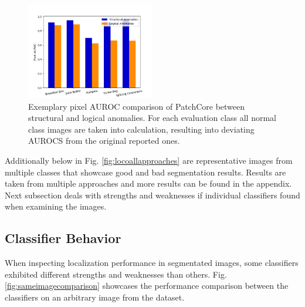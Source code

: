 \begin{figure}[H]
    \centering
    \includegraphics[width=0.5\textwidth]{figures/structvslogic.png}
    \caption{Exemplary pixel AUROC comparison of PatchCore \cite{patchCore2022} between structural and logical anomalies. For each evaluation class all normal class images 
             are taken into calculation, resulting into deviating AUROCS from the original reported ones.}
    \label{fig:structvslogic}
\end{figure}

Additionally below in Fig. \ref{fig:locoallapproaches} are representative images from multiple classes that showcase good and bad segmentation results. Results are taken from multiple approaches and 
more results can be found in the appendix. Next subsection deals with strengths and weaknesses if individual classifiers found when examining the images.

%
%




\subsection{Classifier Behavior}
\label{subsec:classifierbehavior}

When inspecting localization performance in segmentated images, some classifiers exhibited different strengths and weaknesses than others. Fig. \ref{fig:sameimagecomparison} showcases 
the performance comparison between the classifiers on an arbitrary image from the dataset.



